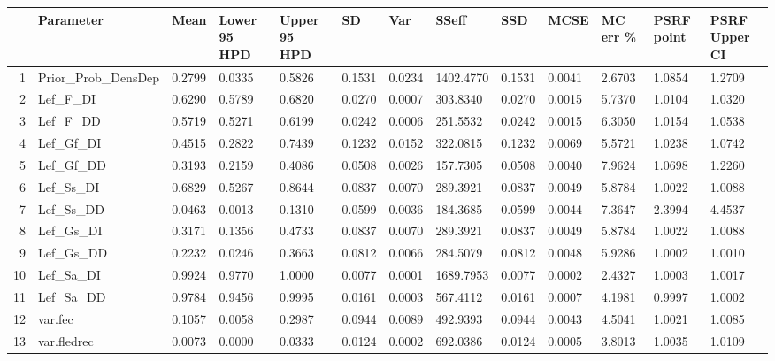 \begin{table}[ht]
\centering
\begin{tabular}{rllllllllllll}
  \hline
 & Parameter & Mean & Lower 95 HPD & Upper 95 HPD & SD & Var & SSeff & SSD & MCSE & MC err \% & PSRF point & PSRF Upper CI \\ 
  \hline
1 & Prior\_Prob\_DensDep &   0.2799 &    0.0335 &   0.5826 &   0.1531 &     0.0234 & 1402.4770 &   0.1531 &  0.0041 &  2.6703 & 1.0854 &  1.2709 \\ 
  2 & Lef\_F\_DI &   0.6290 &    0.5789 &   0.6820 &   0.0270 &     0.0007 &  303.8340 &   0.0270 &  0.0015 &  5.7370 & 1.0104 &  1.0320 \\ 
  3 & Lef\_F\_DD &   0.5719 &    0.5271 &   0.6199 &   0.0242 &     0.0006 &  251.5532 &   0.0242 &  0.0015 &  6.3050 & 1.0154 &  1.0538 \\ 
  4 & Lef\_Gf\_DI &   0.4515 &    0.2822 &   0.7439 &   0.1232 &     0.0152 &  322.0815 &   0.1232 &  0.0069 &  5.5721 & 1.0238 &  1.0742 \\ 
  5 & Lef\_Gf\_DD &   0.3193 &    0.2159 &   0.4086 &   0.0508 &     0.0026 &  157.7305 &   0.0508 &  0.0040 &  7.9624 & 1.0698 &  1.2260 \\ 
  6 & Lef\_Ss\_DI &   0.6829 &    0.5267 &   0.8644 &   0.0837 &     0.0070 &  289.3921 &   0.0837 &  0.0049 &  5.8784 & 1.0022 &  1.0088 \\ 
  7 & Lef\_Ss\_DD &   0.0463 &    0.0013 &   0.1310 &   0.0599 &     0.0036 &  184.3685 &   0.0599 &  0.0044 &  7.3647 & 2.3994 &  4.4537 \\ 
  8 & Lef\_Gs\_DI &   0.3171 &    0.1356 &   0.4733 &   0.0837 &     0.0070 &  289.3921 &   0.0837 &  0.0049 &  5.8784 & 1.0022 &  1.0088 \\ 
  9 & Lef\_Gs\_DD &   0.2232 &    0.0246 &   0.3663 &   0.0812 &     0.0066 &  284.5079 &   0.0812 &  0.0048 &  5.9286 & 1.0002 &  1.0010 \\ 
  10 & Lef\_Sa\_DI &   0.9924 &    0.9770 &   1.0000 &   0.0077 &     0.0001 & 1689.7953 &   0.0077 &  0.0002 &  2.4327 & 1.0003 &  1.0017 \\ 
  11 & Lef\_Sa\_DD &   0.9784 &    0.9456 &   0.9995 &   0.0161 &     0.0003 &  567.4112 &   0.0161 &  0.0007 &  4.1981 & 0.9997 &  1.0002 \\ 
  12 & var.fec &   0.1057 &    0.0058 &   0.2987 &   0.0944 &     0.0089 &  492.9393 &   0.0944 &  0.0043 &  4.5041 & 1.0021 &  1.0085 \\ 
  13 & var.fledrec &   0.0073 &    0.0000 &   0.0333 &   0.0124 &     0.0002 &  692.0386 &   0.0124 &  0.0005 &  3.8013 & 1.0035 &  1.0109 \\ 

\end{tabular}
\end{table}
